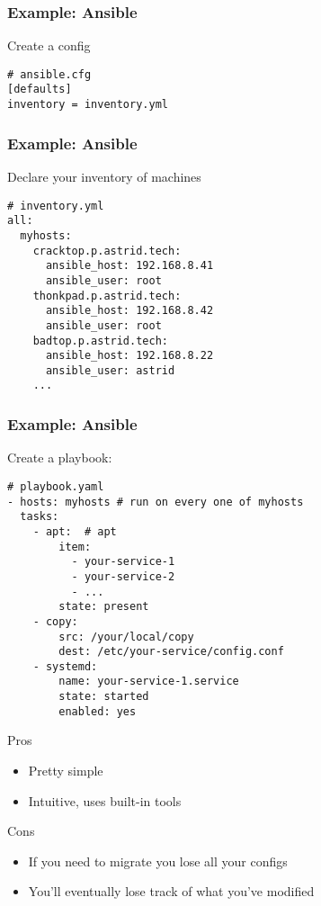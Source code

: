 \documentclass{beamer}
\begin{document}
\begin{frame}[fragile]
    \frametitle{Example: Ansible}

    Create a config
    \begin{verbatim}
# ansible.cfg
[defaults]
inventory = inventory.yml
    \end{verbatim}
\end{frame}

\begin{frame}[fragile]
    \frametitle{Example: Ansible}

    Declare your inventory of machines
    \begin{verbatim}
# inventory.yml
all:
  myhosts:
    cracktop.p.astrid.tech:
      ansible_host: 192.168.8.41
      ansible_user: root
    thonkpad.p.astrid.tech:
      ansible_host: 192.168.8.42
      ansible_user: root
    badtop.p.astrid.tech:
      ansible_host: 192.168.8.22
      ansible_user: astrid
    ...
    \end{verbatim}
\end{frame}

\begin{frame}[fragile]
    \frametitle{Example: Ansible}

    Create a playbook:
    \begin{verbatim}
# playbook.yaml
- hosts: myhosts # run on every one of myhosts
  tasks:
    - apt:  # apt
        item: 
          - your-service-1
          - your-service-2
          - ...
        state: present
    - copy:
        src: /your/local/copy
        dest: /etc/your-service/config.conf
    - systemd:
        name: your-service-1.service
        state: started
        enabled: yes
        \end{verbatim}
\end{frame}

\begin{frame}
    \begin{alertblock}{Pros}
        \begin{itemize}
            \item Pretty simple
            \item Intuitive, uses built-in tools
        \end{itemize}
    \end{alertblock}
    \pause

    \begin{alertblock}{Cons}
        \begin{itemize}
            \item If you need to migrate you lose all your configs
            \item You'll eventually lose track of what you've modified
        \end{itemize}
    \end{alertblock}
\end{frame}
\end{document}
